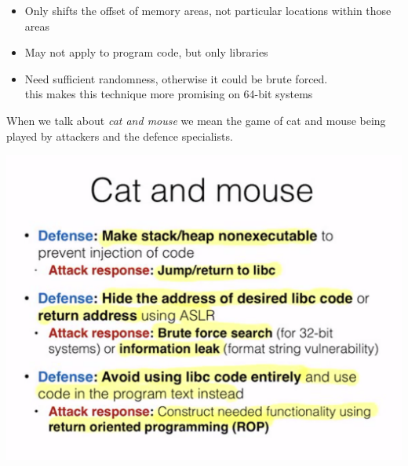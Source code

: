 \documentclass[11pt, oneside]{article}   	%
\begin{document}
\begin{itemize}
\item Only shifts the offset of memory areas, not particular locations within those areas
\item May not apply to program code, but only libraries
\item Need sufficient randomness, otherwise it could be brute forced.\\
this makes this technique more promising on 64-bit systems
\end{itemize}
When we talk about \emph{cat and mouse} we mean the game of cat and mouse being played by attackers and the defence specialists.
\begin{center}
\includegraphics[scale = 0.5]{catmouse}
\end{center}
\end{document}
